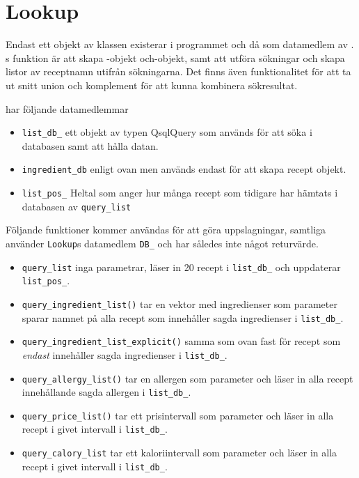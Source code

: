 \section{Lookup}
Endast ett objekt av klassen \Lookup{} existerar i programmet och då som datamedlem av \Shell. \Lookup{}s funktion är att skapa \Recipe-objekt och\InfoIngredient-objekt, samt att utföra sökningar och skapa listor av receptnamn utifrån sökningarna. Det finns även funktionalitet för att ta ut snitt union och komplement för att kunna kombinera sökresultat.

\Lookup har följande datamedlemmar
  \begin{itemize}
    \item   \verb+list_db_+ ett objekt av typen QsqlQuery som används för att söka i databasen samt att hålla datan.
    \item   \verb+ingredient_db+ enligt ovan men används endast för att skapa recept objekt.
    \item   \verb+list_pos_+ Heltal som anger hur många recept som tidigare har hämtats i databasen av \verb+query_list+
  \end{itemize}

Följande funktioner kommer användas för att göra uppslagningar,
samtliga använder \verb+Lookup+s datamedlem \verb+DB_+ och har således 
inte något returvärde. 

  \begin{itemize}
    \item   \verb+query_list+ inga parametrar, läser in 20 recept i \verb+list_db_+ och uppdaterar \verb+list_pos_+.
    \item   \verb+query_ingredient_list()+ tar en vektor med ingredienser som parameter sparar namnet på alla recept som innehåller sagda ingredienser i \verb+list_db_+.
    \item   \verb+query_ingredient_list_explicit()+ samma som ovan fast för recept som \emph{endast} innehåller sagda ingredienser i \verb+list_db_+.
    \item   \verb+query_allergy_list()+ tar en allergen som parameter och läser in alla recept innehållande sagda allergen i \verb+list_db_+.
    \item   \verb+query_price_list()+ tar ett prisintervall som parameter och läser in alla recept i givet intervall i \verb+list_db_+.
    \item   \verb+query_calory_list+ tar ett kaloriintervall som parameter och läser in alla recept i givet intervall i \verb+list_db_+.
  \end{itemize}
 

